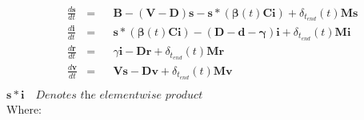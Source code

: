 \documentclass{article}
\theoremstyle{definition}
\begin{document}
\begin{align*}
&\frac{d\mathbf{s}}{dt} &=&& \mathbf{B} - (\mathbf{V} - \mathbf{D})\mathbf{s} - \mathbf{s}*(\pmb{\beta}(t)\mathbf{C}\mathbf
{i})+\delta_{t_{end}}(t)\mathbf{M}\mathbf{s}\\
&\frac{d\mathbf{i}}{dt} &=&&\mathbf{s}*(\pmb{\beta}(t)\mathbf{C}\mathbf{i}) - (\mathbf{D}-\mathbf{d} - \mathbf{\gamma})\mathbf{i}+\delta_{t_{end}}(t)\mathbf{M}\mathbf{i}\\
&\frac{d\mathbf{r}}{dt} &=&& \gamma\mathbf{i} - \mathbf{D}\mathbf{r}+\delta_{t_{end}}(t)\mathbf{M}\mathbf{r}\\
&\frac{d\mathbf{v}}{dt} &=&& \mathbf{V}\mathbf{s}-\mathbf{D}\mathbf{v} +\delta_{t_{end}}(t)\mathbf{M}\mathbf{v}\\
\end{align*}
$\mathbf{s}*\mathbf{i}\quad\textit{Denotes the elementwise product}$\\
Where:
\end{document}
